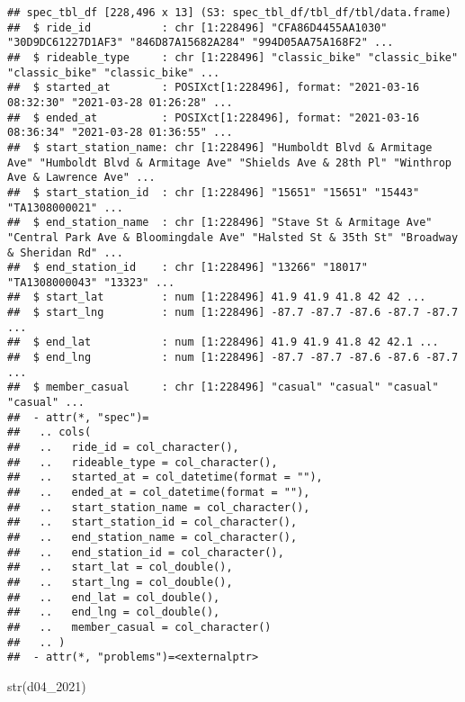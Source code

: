 \documentclass[
]{article}
\newenvironment{Shaded}{\begin{snugshade}}{\end{snugshade}}
\newcommand{\FunctionTok}[1]{\textcolor[rgb]{0.00,0.00,0.00}{#1}}
\newcommand{\NormalTok}[1]{#1}
\begin{document}
\begin{verbatim}
## spec_tbl_df [228,496 x 13] (S3: spec_tbl_df/tbl_df/tbl/data.frame)
##  $ ride_id           : chr [1:228496] "CFA86D4455AA1030" "30D9DC61227D1AF3" "846D87A15682A284" "994D05AA75A168F2" ...
##  $ rideable_type     : chr [1:228496] "classic_bike" "classic_bike" "classic_bike" "classic_bike" ...
##  $ started_at        : POSIXct[1:228496], format: "2021-03-16 08:32:30" "2021-03-28 01:26:28" ...
##  $ ended_at          : POSIXct[1:228496], format: "2021-03-16 08:36:34" "2021-03-28 01:36:55" ...
##  $ start_station_name: chr [1:228496] "Humboldt Blvd & Armitage Ave" "Humboldt Blvd & Armitage Ave" "Shields Ave & 28th Pl" "Winthrop Ave & Lawrence Ave" ...
##  $ start_station_id  : chr [1:228496] "15651" "15651" "15443" "TA1308000021" ...
##  $ end_station_name  : chr [1:228496] "Stave St & Armitage Ave" "Central Park Ave & Bloomingdale Ave" "Halsted St & 35th St" "Broadway & Sheridan Rd" ...
##  $ end_station_id    : chr [1:228496] "13266" "18017" "TA1308000043" "13323" ...
##  $ start_lat         : num [1:228496] 41.9 41.9 41.8 42 42 ...
##  $ start_lng         : num [1:228496] -87.7 -87.7 -87.6 -87.7 -87.7 ...
##  $ end_lat           : num [1:228496] 41.9 41.9 41.8 42 42.1 ...
##  $ end_lng           : num [1:228496] -87.7 -87.7 -87.6 -87.6 -87.7 ...
##  $ member_casual     : chr [1:228496] "casual" "casual" "casual" "casual" ...
##  - attr(*, "spec")=
##   .. cols(
##   ..   ride_id = col_character(),
##   ..   rideable_type = col_character(),
##   ..   started_at = col_datetime(format = ""),
##   ..   ended_at = col_datetime(format = ""),
##   ..   start_station_name = col_character(),
##   ..   start_station_id = col_character(),
##   ..   end_station_name = col_character(),
##   ..   end_station_id = col_character(),
##   ..   start_lat = col_double(),
##   ..   start_lng = col_double(),
##   ..   end_lat = col_double(),
##   ..   end_lng = col_double(),
##   ..   member_casual = col_character()
##   .. )
##  - attr(*, "problems")=<externalptr>
\end{verbatim}

\begin{Shaded}
\begin{Highlighting}[]
\FunctionTok{str}\NormalTok{(d04\_2021)}
\end{Highlighting}
\end{Shaded}
\end{document}
